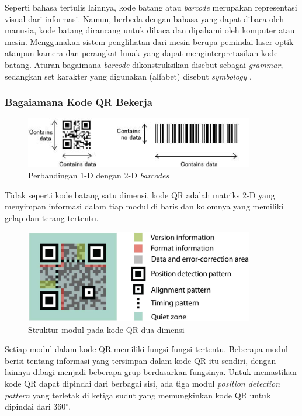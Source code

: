 Seperti bahasa tertulis lainnya, kode batang atau \emph{barcode} merupakan representasi visual dari informasi. Namun, berbeda dengan bahasa yang dapat dibaca oleh manusia, kode batang dirancang untuk dibaca dan dipahami oleh komputer atau mesin. Menggunakan sistem penglihatan dari mesin berupa pemindai laser optik ataupun kamera dan perangkat lunak yang dapat menginterpretasikan kode batang. Aturan bagaimana \emph{barcode} dikonstruksikan disebut sebagai \emph{grammar}, sedangkan set karakter yang digunakan (alfabet) disebut \emph{symbology} \cite{densoqrcode}.

\subsubsection{Bagaiamana Kode QR Bekerja}
\begin{figure}[h]
	\centering
	\includegraphics[width=10cm]{contents/chapter-2/2-2dvs1dcode.jpg}
	\caption{Perbandingan 1-D dengan 2-D \emph{barcodes}}
	\label{Fig: 2-2dvs1dcode}
\end{figure}

Tidak seperti kode batang satu dimensi, kode QR adalah matriks 2-D yang menyimpan informasi dalam tiap modul di baris dan kolomnya yang memiliki gelap dan terang tertentu.

\begin{figure}[h]
	\centering
	\includegraphics[width=10cm]{contents/chapter-2/2-strukturqrasli.jpg}
	\caption{Struktur modul pada kode QR dua dimensi}
	\label{Fig: 2-strukturqrasli}
\end{figure}

Setiap modul dalam kode QR memiliki fungsi-fungsi tertentu. Beberapa modul berisi tentang informasi yang tersimpan dalam kode QR itu sendiri, dengan lainnya dibagi menjadi beberapa grup berdasarkan fungsinya. Untuk memastikan kode QR dapat dipindai dari berbagai sisi, ada tiga modul \emph{position detection pattern} yang terletak di ketiga sudut yang memungkinkan kode QR untuk dipindai dari 360$^{\circ}$.

